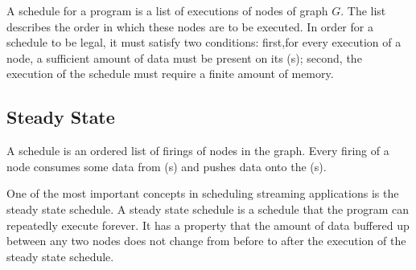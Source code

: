 \begin{comment}
Each {\joiner} node $n_j$ is associated with a tuple $(w_j, u_j)$.
The first value is a vector of integers, each representing the
amount of data that will be consumed by $n_j$ from its
corresponding {\Input} {\Channels}.  In order to execute $n_j$,
each of its {\Input} {\Channels} must have at least as much data
in it as the corresponding value in $w_j$ indicates.  $u_j$
represents the amount of data that will be pushed by $n_j$ onto
its {\Output} {\Channel}. The amount of data present in the $i$th
{\Input} {\Channel} of a {\joiner} node $n_j$ is denoted
$in_{j,i}$, while data present in the {\Output} {\Channel} is
denoted $in_s$.
\end{comment}

A schedule for a {\StreamIt} program is a list of executions of
nodes of graph $G$.  The list describes the order in which these
nodes are to be executed.  In order for a schedule to be legal, it
must satisfy two conditions: first,for every execution of a node,
a sufficient amount of data must be present on its {\Input}
{\Channel}(s); second, the execution of the schedule must require
a finite amount of memory.

\subsection{Steady State}
\label{sec:steady-state}

A {\StreamIt} schedule is an ordered list of firings of nodes in the
{\StreamIt} graph.  Every firing of a node consumes some data from
{\Input} {\Channel}(s) and pushes data onto the {\Output} {\Channel}(s).

One of the most important concepts in scheduling streaming
applications is the steady state schedule.  A steady state
schedule is a schedule that the program can repeatedly execute
forever.  It has a property that the amount of data buffered up
between any two nodes does not change from before to after the
execution of the steady state schedule.

\begin{comment}
This property is important, because it allows the compiler to
statically schedule the program at compile time, and simply repeat
the schedule forever at runtime.  A schedule without this property
cannot be repeated continuously.  This is because the delta in
amount of data buffered up on between nodes will continue
accumulating, requiring an infinite amount of buffering space.
\end{comment}

